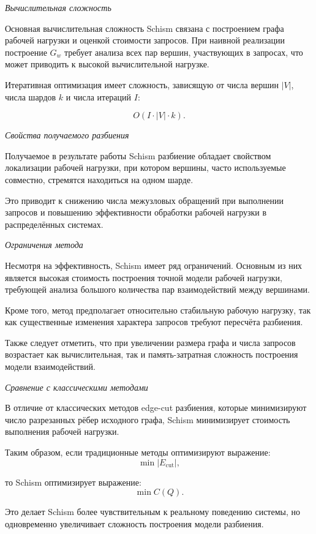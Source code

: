 \textit{Вычислительная сложность}

Основная вычислительная сложность Schism связана с построением графа рабочей нагрузки и оценкой стоимости запросов. При наивной реализации построение $G_w$ требует анализа всех пар вершин, участвующих в запросах, что может приводить к высокой вычислительной нагрузке.

Итеративная оптимизация имеет сложность, зависящую от числа вершин $|V|$, числа шардов $k$ и числа итераций $I$:

\begin{equation*}
O(I \cdot |V| \cdot k).
\end{equation*}

\textit{Свойства получаемого разбиения}

Получаемое в результате работы Schism разбиение обладает свойством локализации рабочей нагрузки, при котором вершины, часто используемые совместно, стремятся находиться на одном шарде.

Это приводит к снижению числа межузловых обращений при выполнении запросов и повышению эффективности обработки рабочей нагрузки в распределённых системах.

\textit{Ограничения метода}

Несмотря на эффективность, Schism имеет ряд ограничений. Основным из них является высокая стоимость построения точной модели рабочей нагрузки, требующей анализа большого количества пар взаимодействий между вершинами.

Кроме того, метод предполагает относительно стабильную рабочую нагрузку, так как существенные изменения характера запросов требуют пересчёта разбиения.

Также следует отметить, что при увеличении размера графа и числа запросов возрастает как вычислительная, так и память-затратная сложность построения модели взаимодействий.

\textit{Сравнение с классическими методами}

В отличие от классических методов edge-cut разбиения, которые минимизируют число разрезанных рёбер исходного графа, Schism минимизирует стоимость выполнения рабочей нагрузки.

Таким образом, если традиционные методы оптимизируют выражение:
\begin{equation*}
\min |E_{\text{cut}}|,
\end{equation*}

то Schism оптимизирует выражение:
\begin{equation*}
\min C(Q).
\end{equation*}

Это делает Schism более чувствительным к реальному поведению системы, но одновременно увеличивает сложность построения модели разбиения.